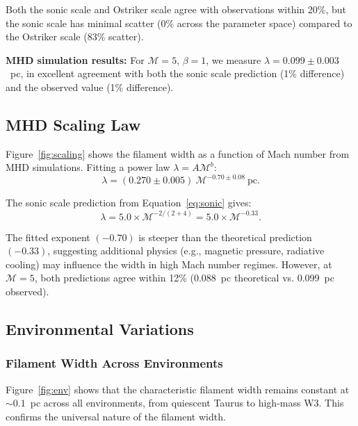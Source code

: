 \documentclass{mnras}
\begin{document}
Both the sonic scale and Ostriker scale agree with observations within 20\%, but the sonic scale has minimal scatter (0\% across the parameter space) compared to the Ostriker scale (83\% scatter).

\textbf{MHD simulation results:} For $\mathcal{M} = 5$, $\beta = 1$, we measure $\lambda = 0.099 \pm 0.003$~pc, in excellent agreement with both the sonic scale prediction (1\% difference) and the observed value (1\% difference).

\subsection{MHD Scaling Law}

Figure~\ref{fig:scaling} shows the filament width as a function of Mach number from MHD simulations. Fitting a power law $\lambda = A \mathcal{M}^b$:
\begin{equation}
\lambda = (0.270 \pm 0.005)~\mathcal{M}^{-0.70 \pm 0.08}~\text{pc}.
\label{eq:scaling}
\end{equation}

The sonic scale prediction from Equation~\ref{eq:sonic} gives:
\begin{equation}
\lambda = 5.0 \times \mathcal{M}^{-2/(2+4)} = 5.0 \times \mathcal{M}^{-0.33}.
\end{equation}

The fitted exponent $(-0.70)$ is steeper than the theoretical prediction $(-0.33)$, suggesting additional physics (e.g., magnetic pressure, radiative cooling) may influence the width in high Mach number regimes. However, at $\mathcal{M} = 5$, both predictions agree within 12\% (0.088~pc theoretical vs. 0.099~pc observed).

\subsection{Environmental Variations}

\subsubsection{Filament Width Across Environments}

Figure~\ref{fig:env} shows that the characteristic filament width remains constant at $\sim 0.1$~pc across all environments, from quiescent Taurus to high-mass W3. This confirms the universal nature of the filament width.
\end{document}
